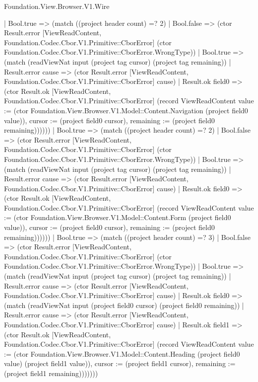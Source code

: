 \begin{lexlean}{Foundation.View.Browser.V1.Wire}
\begin{semanticmodule}
{                              | Bool.true => (match ((project header count) =? 2)
                                | Bool.false => (ctor Result.error [ViewReadContent, Foundation.Codec.Cbor.V1.Primitive::CborError] (ctor Foundation.Codec.Cbor.V1.Primitive::CborError.WrongType))
                                | Bool.true => (match (readViewNat input (project tag cursor) (project tag remaining))
                                  | Result.error cause => (ctor Result.error [ViewReadContent, Foundation.Codec.Cbor.V1.Primitive::CborError] cause)
                                  | Result.ok field0 => (ctor Result.ok [ViewReadContent, Foundation.Codec.Cbor.V1.Primitive::CborError] (record ViewReadContent {value := (ctor Foundation.View.Browser.V1.Model::Content.Navigation (project field0 value)), cursor := (project field0 cursor), remaining := (project field0 remaining)})))))
                            | Bool.true => (match ((project header count) =? 2)
                              | Bool.false => (ctor Result.error [ViewReadContent, Foundation.Codec.Cbor.V1.Primitive::CborError] (ctor Foundation.Codec.Cbor.V1.Primitive::CborError.WrongType))
                              | Bool.true => (match (readViewNat input (project tag cursor) (project tag remaining))
                                | Result.error cause => (ctor Result.error [ViewReadContent, Foundation.Codec.Cbor.V1.Primitive::CborError] cause)
                                | Result.ok field0 => (ctor Result.ok [ViewReadContent, Foundation.Codec.Cbor.V1.Primitive::CborError] (record ViewReadContent {value := (ctor Foundation.View.Browser.V1.Model::Content.Form (project field0 value)), cursor := (project field0 cursor), remaining := (project field0 remaining)})))))
                          | Bool.true => (match ((project header count) =? 3)
                            | Bool.false => (ctor Result.error [ViewReadContent, Foundation.Codec.Cbor.V1.Primitive::CborError] (ctor Foundation.Codec.Cbor.V1.Primitive::CborError.WrongType))
                            | Bool.true => (match (readViewNat input (project tag cursor) (project tag remaining))
                              | Result.error cause => (ctor Result.error [ViewReadContent, Foundation.Codec.Cbor.V1.Primitive::CborError] cause)
                              | Result.ok field0 => (match (readViewNat input (project field0 cursor) (project field0 remaining))
                                | Result.error cause => (ctor Result.error [ViewReadContent, Foundation.Codec.Cbor.V1.Primitive::CborError] cause)
                                | Result.ok field1 => (ctor Result.ok [ViewReadContent, Foundation.Codec.Cbor.V1.Primitive::CborError] (record ViewReadContent {value := (ctor Foundation.View.Browser.V1.Model::Content.Heading (project field0 value) (project field1 value)), cursor := (project field1 cursor), remaining := (project field1 remaining)}))))))
}
\end{semanticmodule}
\end{lexlean}
